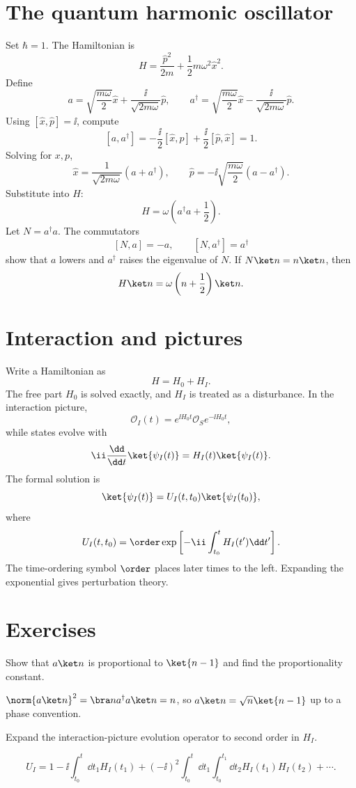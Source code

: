 \section{The quantum harmonic oscillator}

Set \(\hbar=1\).  The Hamiltonian is
\[
  H=\frac{\hat p^2}{2m}+\frac12m\omega^2\hat x^2.
\]
Define
\[
  a=\sqrt{\frac{m\omega}{2}}\hat x+\frac{\ii}{\sqrt{2m\omega}}\hat p,
  \qquad
  a^\dagger=\sqrt{\frac{m\omega}{2}}\hat x-\frac{\ii}{\sqrt{2m\omega}}\hat p.
\]
Using \([\hat x,\hat p]=\ii\), compute
\[
  [a,a^\dagger]
  =
  -\frac{\ii}{2}[\hat x,\hat p]
  +\frac{\ii}{2}[\hat p,\hat x]
  =
  1.
\]
Solving for \(x,p\),
\[
  \hat x=\frac{1}{\sqrt{2m\omega}}(a+a^\dagger),
  \qquad
  \hat p=-\ii\sqrt{\frac{m\omega}{2}}(a-a^\dagger).
\]
Substitute into \(H\):
\[
  H=\omega\left(a^\dagger a+\frac12\right).
\]
Let \(N=a^\dagger a\).  The commutators
\[
  [N,a]=-a,\qquad [N,a^\dagger]=a^\dagger
\]
show that \(a\) lowers and \(a^\dagger\) raises the eigenvalue of \(N\).  If \(N\ket n=n\ket n\), then
\[
  H\ket n=\omega\left(n+\frac12\right)\ket n.
\]

\section{Interaction and pictures}

Write a Hamiltonian as
\[
  H=H_0+H_I.
\]
The free part \(H_0\) is solved exactly, and \(H_I\) is treated as a disturbance.  In the interaction picture,
\[
  \mathcal O_I(t)=e^{\ii H_0t}\mathcal O_S e^{-\ii H_0t},
\]
while states evolve with
\[
  \ii\frac{\dd}{\dd t}\ket{\psi_I(t)}=H_I(t)\ket{\psi_I(t)}.
\]
The formal solution is
\[
  \ket{\psi_I(t)}
  =
  U_I(t,t_0)\ket{\psi_I(t_0)},
\]
where
\[
  U_I(t,t_0)
  =
  \order\exp\left[-\ii\int_{t_0}^{t}H_I(t')\dd t'\right].
\]
The time-ordering symbol \(\order\) places later times to the left.  Expanding the exponential gives perturbation theory.

\section*{Exercises}

\begin{exercise}
Show that \(a\ket n\) is proportional to \(\ket{n-1}\) and find the proportionality constant.
\begin{answer}
\(\norm{a\ket n}^2=\bra n a^\dagger a\ket n=n\), so \(a\ket n=\sqrt n\ket{n-1}\) up to a phase convention.
\end{answer}
\end{exercise}

\begin{exercise}
Expand the interaction-picture evolution operator to second order in \(H_I\).
\begin{answer}
\[
U_I=1-\ii\int_{t_0}^t\dd t_1H_I(t_1)
 +(-\ii)^2\int_{t_0}^t\dd t_1\int_{t_0}^{t_1}\dd t_2H_I(t_1)H_I(t_2)+\cdots.
\]
\end{answer}
\end{exercise}

